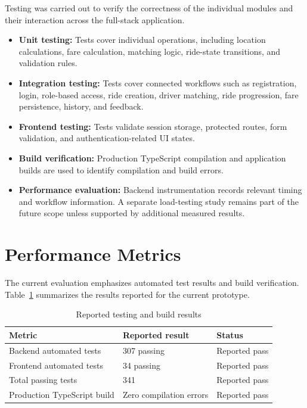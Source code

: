 \documentclass{tietreport}
\begin{document}
Testing was carried out to verify the correctness of the
individual modules and their interaction across the
full-stack application.

\begin{itemize}
    \item \textbf{Unit testing:}
    Tests cover individual operations, including location
    calculations, fare calculation, matching logic, ride-state
    transitions, and validation rules.

    \item \textbf{Integration testing:}
    Tests cover connected workflows such as registration,
    login, role-based access, ride creation, driver matching,
    ride progression, fare persistence, history, and feedback.

    \item \textbf{Frontend testing:}
    Tests validate session storage, protected routes,
    form validation, and authentication-related UI states.

    \item \textbf{Build verification:}
    Production TypeScript compilation and application builds
    are used to identify compilation and build errors.

    \item \textbf{Performance evaluation:}
    Backend instrumentation records relevant timing and
    workflow information. A separate load-testing study
    remains part of the future scope unless supported by
    additional measured results.
\end{itemize}

\section{Performance Metrics}

The current evaluation emphasizes automated test results
and build verification. Table~\ref{tab:testresults}
summarizes the results reported for the current prototype.

\begin{table}[H]
\centering
\small
\renewcommand{\arraystretch}{1.3}
\begin{tabularx}{0.92\textwidth}{X p{} p{}}
\toprule
\textbf{Metric} & \textbf{Reported result} & \textbf{Status} \\
\midrule
Backend automated tests & 307 passing & Reported pass \\
Frontend automated tests & 34 passing & Reported pass \\
Total passing tests & 341 & Reported pass \\
Production TypeScript build & Zero compilation errors & Reported pass \\
\bottomrule
\end{tabularx}
\caption{Reported testing and build results}
\label{tab:testresults}
\end{table}
\end{document}
